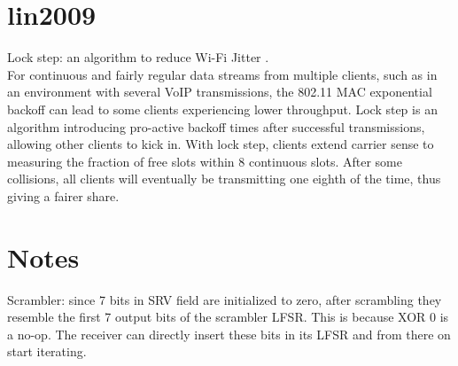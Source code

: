 
\section{lin2009}

Lock step: an algorithm to reduce Wi-Fi Jitter \cite{lin2009}.\\

For continuous and fairly regular data streams from multiple clients, such as in an environment with several VoIP transmissions, the 802.11 MAC exponential backoff can lead to some clients experiencing lower throughput. Lock step is an algorithm introducing pro-active backoff times after successful transmissions, allowing other clients to kick in. With lock step, clients extend carrier sense to measuring the fraction of free slots within 8 continuous slots. After some collisions, all clients will eventually be transmitting one eighth of the time, thus giving a fairer share.





\section{Notes}

Scrambler: since 7 bits in SRV field are initialized to zero, after scrambling they resemble the first 7 output bits of the scrambler LFSR. This is because XOR 0 is a no-op. The receiver can directly insert these bits in its LFSR and from there on start iterating.
